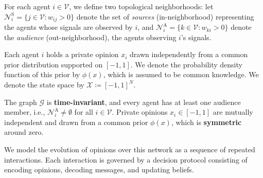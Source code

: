 \documentclass[journal,twoside,web]{ieeecolor}
\begin{document}
For each agent $i \in \mathcal{V}$, we define two topological neighborhoods: let $\mathcal{N}_i^{\mathrm{S}} = \{j \in \mathcal{V}: w_{ij}>0\}$ denote the set of \emph{sources} (in-neighborhood) representing the agents whose signals are observed by $i$, and $\mathcal{N}_i^{\mathrm{A}} = \{k \in \mathcal{V}: w_{ki}>0\}$ denote the \emph{audience} (out-neighborhood), the agents observing $i$'s signals.

Each agent $i$ holds a private opinion $x_i$ drawn independently from a common prior distribution supported on $[-1,1]$. We denote the probability density function of this prior by $\phi(x)$, which is assumed to be common knowledge. We denote the state space by $\mathcal X\coloneqq[-1,1]^N$.

\begin{standassumption}
    \label{asm:graph}
    The graph $\mathcal{G}$ is \textbf{time-invariant}, and every agent has at least one audience member, i.e., $\mathcal{N}_i^{\mathrm{A}} \neq \emptyset$ for all $i \in \mathcal{V}$. Private opinions $x_i\in[-1,1]$ are mutually independent and drawn from a common prior $\phi(x)$, which is \textbf{symmetric} around zero.
\end{standassumption}

We model the evolution of opinions over this network as a sequence of repeated interactions. Each interaction is governed by a decision protocol consisting of encoding opinions, decoding messages, and updating beliefs.
\end{document}

